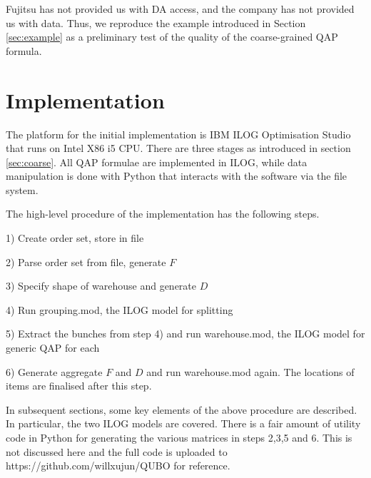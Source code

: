 \documentclass[hyp]{socreport}
\begin{document}
Fujitsu has not provided us with DA access, and the company has not provided us with data. Thus, we reproduce the example introduced in Section \ref{sec:example} as a preliminary test of the quality of the coarse-grained QAP formula.

\section{Implementation}
The platform for the initial implementation is IBM ILOG Optimisation Studio that runs on Intel X86 i5 CPU. There are three stages as introduced in section \ref{sec:coarse}. All QAP formulae are implemented in ILOG, while data manipulation is done with Python that interacts with the software via the file system.

The high-level procedure of the implementation has the following steps.\par
1) Create order set, store in file\par
2) Parse order set from file, generate $F$\par
3) Specify shape of warehouse and generate $D$\par
4) Run grouping.mod, the ILOG model for splitting\par
5) Extract the bunches from step 4) and run warehouse.mod, the ILOG model for generic QAP for each\par
6) Generate aggregate $F$ and $D$ and run warehouse.mod again. The locations of items are finalised after this step.

In subsequent sections, some key elements of the above procedure are described. In particular, the two ILOG models are covered. There is a fair amount of utility code in Python for generating the various matrices in steps 2,3,5 and 6. This is not discussed here and the full code is uploaded to https://github.com/willxujun/QUBO for reference.
\end{document}
